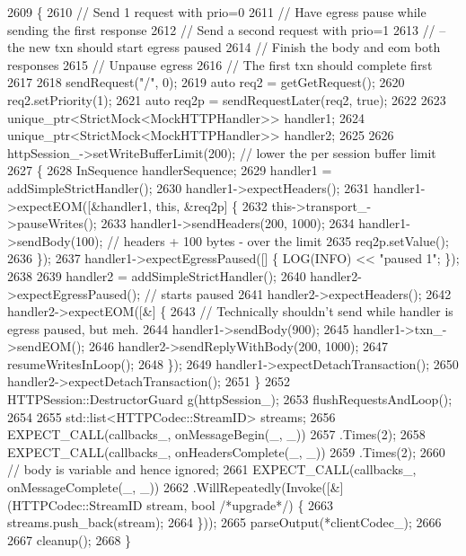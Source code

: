 \begin{DoxyCode}
2609                                                        \{
2610   \textcolor{comment}{// Send 1 request with prio=0}
2611   \textcolor{comment}{// Have egress pause while sending the first response}
2612   \textcolor{comment}{// Send a second request with prio=1}
2613   \textcolor{comment}{//   -- the new txn should start egress paused}
2614   \textcolor{comment}{// Finish the body and eom both responses}
2615   \textcolor{comment}{// Unpause egress}
2616   \textcolor{comment}{// The first txn should complete first}
2617 
2618   sendRequest(\textcolor{stringliteral}{"/"}, 0);
2619   \textcolor{keyword}{auto} req2 = getGetRequest();
2620   req2.setPriority(1);
2621   \textcolor{keyword}{auto} req2p = sendRequestLater(req2, \textcolor{keyword}{true});
2622 
2623   unique\_ptr<StrictMock<MockHTTPHandler>> handler1;
2624   unique\_ptr<StrictMock<MockHTTPHandler>> handler2;
2625 
2626   httpSession\_->setWriteBufferLimit(200); \textcolor{comment}{// lower the per session buffer limit}
2627   \{
2628     InSequence handlerSequence;
2629     handler1 = addSimpleStrictHandler();
2630     handler1->expectHeaders();
2631     handler1->expectEOM([&handler1, \textcolor{keyword}{this}, &req2p] \{
2632         this->transport\_->pauseWrites();
2633         handler1->sendHeaders(200, 1000);
2634         handler1->sendBody(100); \textcolor{comment}{// headers + 100 bytes - over the limit}
2635         req2p.setValue();
2636       \});
2637     handler1->expectEgressPaused([] \{ LOG(INFO) << \textcolor{stringliteral}{"paused 1"}; \});
2638 
2639     handler2 = addSimpleStrictHandler();
2640     handler2->expectEgressPaused(); \textcolor{comment}{// starts paused}
2641     handler2->expectHeaders();
2642     handler2->expectEOM([&] \{
2643         \textcolor{comment}{// Technically shouldn't send while handler is egress paused, but meh.}
2644         handler1->sendBody(900);
2645         handler1->txn\_->sendEOM();
2646         handler2->sendReplyWithBody(200, 1000);
2647         resumeWritesInLoop();
2648       \});
2649     handler1->expectDetachTransaction();
2650     handler2->expectDetachTransaction();
2651   \}
2652   HTTPSession::DestructorGuard g(httpSession\_);
2653   flushRequestsAndLoop();
2654 
2655   std::list<HTTPCodec::StreamID> streams;
2656   EXPECT\_CALL(callbacks\_, onMessageBegin(\_, \_))
2657     .Times(2);
2658   EXPECT\_CALL(callbacks\_, onHeadersComplete(\_, \_))
2659     .Times(2);
2660   \textcolor{comment}{// body is variable and hence ignored;}
2661   EXPECT\_CALL(callbacks\_, onMessageComplete(\_, \_))
2662       .WillRepeatedly(Invoke([&](HTTPCodec::StreamID stream, \textcolor{keywordtype}{bool} \textcolor{comment}{/*upgrade*/}) \{
2663         streams.push\_back(stream);
2664       \}));
2665   parseOutput(*clientCodec\_);
2666 
2667   cleanup();
2668 \}
\end{DoxyCode}
